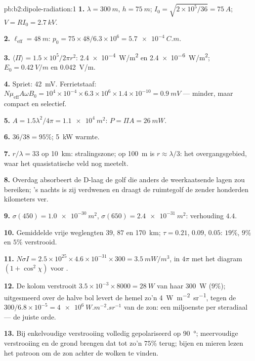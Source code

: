 \begin{solution}{pb:b2:dipole-radiation:1}
\textbf{1.} $\lambda = \qty{300}{m}$, $h = \qty{75}{m}$;
$I_0 = \sqrt{2 \times 10^5/36} = \qty{75}{A}$; $V = RI_0 = \qty{2.7}{kV}$.

\textbf{2.} $\ell_{\text{eff}} = \qty{48}{m}$:
$p_0 = 75 \times 48/6.3 \times 10^6 = \qty{5.7e-4}{C.m}$.

\textbf{3.} $\langle\Pi\rangle = 1.5 \times 10^5/2\pi r^2$:
\qty{2.4e-4}{W/m^2} en \qty{2.4e-6}{W/m^2}; $E_0 = \qty{0.42}{V/m}$ en
\qty{0.042}{V/m}.

\textbf{4.} Spriet: \qty{42}{mV}. Ferrietstaaf:
$N\mu_{\text{eff}}A\omega B_0 = 10^4 \times 10^{-4} \times 6.3 \times
10^6 \times 1.4 \times 10^{-10} = \qty{0.9}{mV}$
--- minder, maar compact en selectief.

\textbf{5.} $A = 1.5\lambda^2/4\pi = \qty{1.1e4}{m^2}$: $P = \Pi A = \qty{26}{mW}$.

\textbf{6.} $36/38 = 95\%$; \qty{5}{kW} warmte.

\textbf{7.} $r/\lambda = 33$ op \qty{10}{km}: stralingszone; op \qty{100}{m}
is $r \approx \lambda/3$: het overgangsgebied, waar het quasistatische veld
nog meetelt.

\textbf{8.} Overdag absorbeert de D-laag de golf die anders de weerkaatsende
lagen zou bereiken; 's nachts is zij verdwenen en draagt de ruimtegolf de
zender honderden kilometers ver.

\textbf{9.} $\sigma(450) = \qty{1.0e-30}{m^2}$,
$\sigma(650) = \qty{2.4e-31}{m^2}$: verhouding $4.4$.

\textbf{10.} Gemiddelde vrije weglengten $39$, $87$ en \qty{170}{km};
$\tau = 0.21$, $0.09$, $0.05$: $19\%$, $9\%$ en $5\%$ verstrooid.

\textbf{11.}
$N\sigma I = 2.5 \times 10^{25} \times 4.6 \times 10^{-31} \times 300 = \qty{3.5}{mW/m^3}$,
in $4\pi$ met het diagram $(1 + \cos^2\chi)$ voor .

\textbf{12.} De kolom verstrooit
$3.5 \times 10^{-3} \times 8000 = \qty{28}{W}$ van haar \qty{300}{W}
($9\%$); uitgesmeerd over de halve bol levert de hemel zo'n
\qty{4}{W.m^{-2}.sr^{-1}}, tegen de
$300/6.8 \times 10^{-5} = \qty{4e6}{W.m^{-2}.sr^{-1}}$ van de zon: een
miljoenste per steradiaal --- de juiste orde.

\textbf{13.} Bij enkelvoudige verstrooiing volledig gepolariseerd op
\qty{90}{\degree}; meervoudige verstrooiing en de grond brengen dat tot zo'n
$75\%$ terug; bijen en mieren lezen het patroon om de zon achter de wolken
te vinden.


\end{solution}
